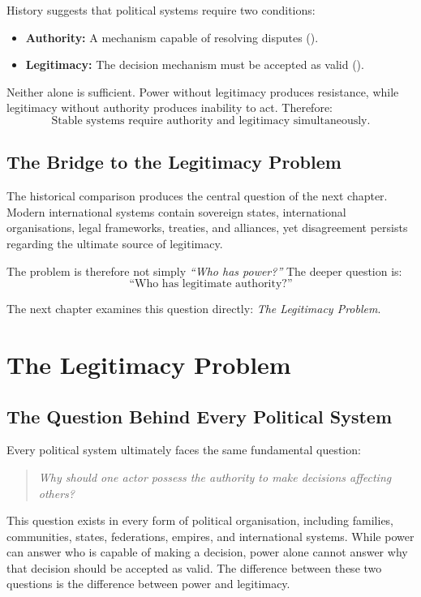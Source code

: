 \documentclass[11pt,openany]{book}
\theoremstyle{plain}
\theoremstyle{definition}
\begin{document}
History suggests that political systems require two conditions:

\begin{itemize}
    \item \textbf{Authority:} A mechanism capable of resolving disputes ().

    \item \textbf\textbf{Legitimacy:} The decision mechanism must be accepted as valid ().
\end{itemize}

Neither alone is sufficient. Power without legitimacy produces resistance, while legitimacy without authority produces inability to act. Therefore:
\[
\boxed{
\text{Stable systems require authority and legitimacy simultaneously.}
}
\]

\section*{The Bridge to the Legitimacy Problem}

The historical comparison produces the central question of the next chapter. Modern international systems contain sovereign states, international organisations, legal frameworks, treaties, and alliances, yet disagreement persists regarding the ultimate source of legitimacy.

The problem is therefore not simply \textit{``Who has power?''} The deeper question is:
\[
\boxed{
\text{``Who has legitimate authority?''}
}
\]

The next chapter examines this question directly: \textit{The Legitimacy Problem}.

\chapter{The Legitimacy Problem}

\section*{The Question Behind Every Political System}

Every political system ultimately faces the same fundamental question:
\begin{quote}
\textit{Why should one actor possess the authority to make decisions affecting others?}
\end{quote}

This question exists in every form of political organisation, including families, communities, states, federations, empires, and international systems. While power can answer who is capable of making a decision, power alone cannot answer why that decision should be accepted as valid. The difference between these two questions is the difference between power and legitimacy.
\end{document}
